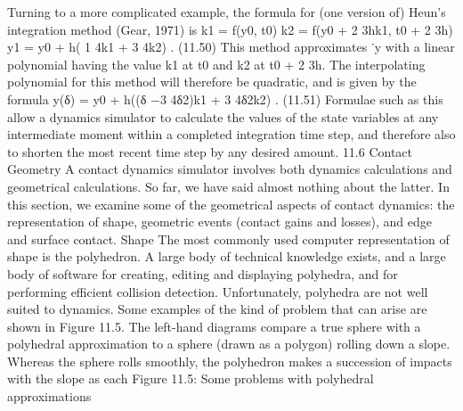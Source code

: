 Turning to a more complicated example, the formula for (one version of) Heun’s integration method (Gear, 1971) is k1 = f(y0, t0) k2 = f(y0 + 2 3hk1, t0 + 2 3h) y1 = y0 + h( 1 4k1 + 3 4k2) . (11.50) This method approximates ˙y with a linear polynomial having the value k1 at t0 and k2 at t0 + 2 3h. The interpolating polynomial for this method will therefore be quadratic, and is given by the formula y(δ) = y0 + h((δ −3 4δ2)k1 + 3 4δ2k2) . (11.51) Formulae such as this allow a dynamics simulator to calculate the values of the state variables at any intermediate moment within a completed integration time step, and therefore also to shorten the most recent time step by any desired amount. 11.6 Contact Geometry A contact dynamics simulator involves both dynamics calculations and geometrical calculations. So far, we have said almost nothing about the latter. In this section, we examine some of the geometrical aspects of contact dynamics: the representation of shape, geometric events (contact gains and losses), and edge and surface contact. Shape The most commonly used computer representation of shape is the polyhedron. A large body of technical knowledge exists, and a large body of software for creating, editing and displaying polyhedra, and for performing efficient collision detection. Unfortunately, polyhedra are not well suited to dynamics. Some examples of the kind of problem that can arise are shown in Figure 11.5. The left-hand diagrams compare a true sphere with a polyhedral approximation to a sphere (drawn as a polygon) rolling down a slope. Whereas the sphere rolls smoothly, the polyhedron makes a succession of impacts with the slope as each Figure 11.5: Some problems with polyhedral approximations

